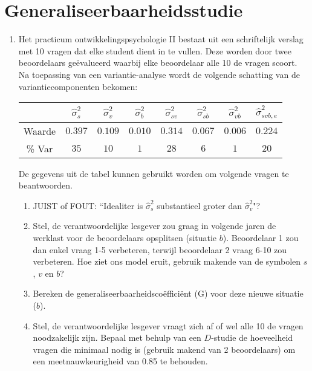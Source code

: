 
\OPGAVE
{
\section{Generaliseerbaarheidsstudie}

\begin{enumerate}

\item
Het practicum ontwikkelingspsychologie II bestaat uit een schriftelijk verslag met 10 vragen dat elke student dient in te vullen. Deze worden door twee beoordelaars ge\"{e}valueerd waarbij elke beoordelaar alle 10 de vragen scoort.\\
Na toepassing van een variantie-analyse wordt de volgende schatting van de variantiecomponenten bekomen:

\begin{center}
\renewcommand{\arraystretch}{1.2}
\begin{tabular}{|c|c|c|c|c|c|c|c|} \hline
 & $ \hat{\sigma}^2_{s} $ & $ \hat{\sigma}^2_{v} $& $ \hat{\sigma}^2_{b} $ & $ \hat{\sigma}^2_{sv} $ & $ \hat{\sigma}^2_{sb} $ & $ \hat{\sigma}^2_{vb} $ & $ \hat{\sigma}^2_{svb,e} $ \\ \hline
Waarde  & $ 0.397 $ & $ 0.109 $ & $ 0.010 $ & $ 0.314 $ & $ 0.067 $ & $ 0.006 $ & $ 0.224 $ \\
\% Var & $ 35 $ & $ 10 $ & $ 1 $ & $ 28 $ & $ 6 $ & $ 1 $ & $ 20 $ \\ \hline
\end{tabular}
\end{center}


\normalsize
De gegevens uit de tabel kunnen gebruikt worden om volgende vragen te beantwoorden.

\begin{enumerate}
\item JUIST of FOUT: ``Idealiter is $ \hat{\sigma}^2_{s} $ substantieel groter dan $ \hat{\sigma}^2_{v}$"?
\item Stel, de verantwoordelijke lesgever zou graag in volgende jaren de werklast voor de beoordelaars opsplitsen (situatie $b$).
Beoordelaar 1 zou dan enkel vraag 1-5 verbeteren, terwijl beoordelaar 2 vraag 6-10 zou verbeteren.
Hoe ziet ons model eruit, gebruik makende van de symbolen $s$, $v$ en $b$?
\item Bereken de generaliseerbaarheidsco\"{e}ffici\"{e}nt (G) voor deze nieuwe situatie ($b$).

\item Stel, de verantwoordelijke lesgever vraagt zich af of wel alle 10 de vragen noodzakelijk zijn. Bepaal met behulp van een $D$-studie de hoeveelheid vragen die minimaal nodig is (gebruik makend van 2 beoordelaars) om een meetnauwkeurigheid van 0.85 te behouden.


\end{enumerate}
\end{enumerate}
}

